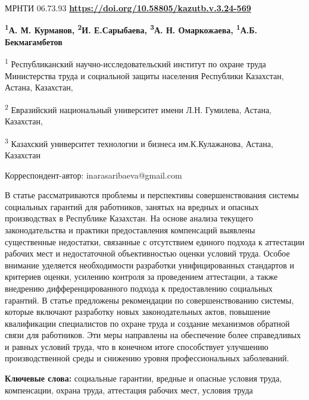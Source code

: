\newpage
МРНТИ 06.73.93
\hfill {\bfseries \href{https://doi.org/10.58805/kazutb.v.3.24-569}{https://doi.org/10.58805/kazutb.v.3.24-569}}


\begin{center}
{\bfseries \textsuperscript{1}А. М. Курманов, \textsuperscript{2}И.
Е.Сарыбаева\envelope, \textsuperscript{3}А. Н. Омаркожаева,
\textsuperscript{1}А.Б. Бекмагамбетов}

\textsuperscript{1} Республиканский научно-исследовательский институт по
охране труда Министерства труда и социальной защиты населения Республики
Казахстан, Астана, Казахстан,

\textsuperscript{2} Евразийский национальный университет имени Л.Н.
Гумилева, Астана, Казахстан,

\textsuperscript{3} Казахский университет технологии и бизнеса
им.К.Кулажанова, Астана, Казахстан
\end{center}

\envelope Корреспондент-автор:
inarasaribaeva@gmail.com

В статье рассматриваются проблемы и перспективы совершенствования
системы социальных гарантий для работников, занятых на вредных и опасных
производствах в Республике Казахстан. На основе анализа текущего
законодательства и практики предоставления компенсаций выявлены
существенные недостатки, связанные с отсутствием единого подхода к
аттестации рабочих мест и недостаточной объективностью оценки условий
труда. Особое внимание уделяется необходимости разработки
унифицированных стандартов и критериев оценки, усилению контроля за
проведением аттестации, а также внедрению дифференцированного подхода к
предоставлению социальных гарантий. В статье предложены рекомендации по
совершенствованию системы, которые включают разработку новых
законодательных актов, повышение квалификации специалистов по охране
труда и создание механизмов обратной связи для работников. Эти меры
направлены на обеспечение более справедливых и равных условий труда, что
в конечном итоге способствует улучшению производственной среды и
снижению уровня профессиональных заболеваний.

{\bfseries Ключевые слова:} социальные гарантии, вредные и опасные условия
труда, компенсации, охрана труда, аттестация рабочих мест, условия труда

